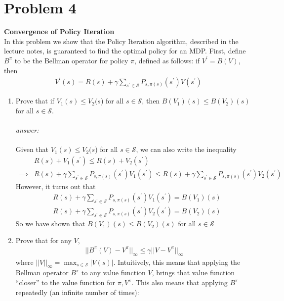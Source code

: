 \documentclass{article}
\begin{document}
\section*{Problem 4}
    \textbf{Convergence of Policy Iteration}\\
    In this problem we show that the Policy Iteration algorithm, described in the lecture notes, is guaranteed to find the optimal policy for an MDP. First, define $B^\pi$ to be the Bellman operator for policy $\pi$, defined as follows: if $V^\prime = B(V)$, then\begin{align*}
        V^\prime (s) = R(s)+\gamma \sum_{s^\prime \in \mathcal{S}}P_{s,\pi(s)}(s^\prime )V(s^\prime)
    \end{align*}
\begin{enumerate}[label=(\alph*)]
\item Prove that if $V_1(s) \leq  V_2(s$) for all $s\in \mathcal{S}$, then $B(V_1)(s) \leq  B(V_2)(s)$ for all $s\in \mathcal{S}$.\\\\
\textit{answer:}\\\\
Given that $V_1(s) \leq  V_2(s$) for all $s\in \mathcal{S}$, we can also write the inequality
\begin{align*}
    &R(s) + V_1(s^\prime) \leq R(s) + V_2(s^\prime)\\
    \implies& R(s) + \gamma \sum_{s^\prime \in \mathcal{S}}P_{s,\pi(s)}(s^\prime )V_1(s^\prime) \leq R(s) + \gamma \sum_{s^\prime \in \mathcal{S}}P_{s,\pi(s)}(s^\prime )V_2(s^\prime)
\end{align*}
However, it turns out that
\begin{align*}
    &R(s) + \gamma \sum_{s^\prime \in \mathcal{S}}P_{s,\pi(s)}(s^\prime )V_1(s^\prime) = B(V_1)(s)\\
    &R(s) + \gamma \sum_{s^\prime \in \mathcal{S}}P_{s,\pi(s)}(s^\prime )V_2(s^\prime) = B(V_2)(s)
\end{align*}
So we have shown that $B(V_1)(s) \leq B(V_2)(s)$ for all $s \in \mathcal{S}$
\item Prove that for any $V$, \begin{align*}
    ||B^\pi(V)-V^\pi ||_\infty\leq \gamma ||V-V^\pi ||_\infty
\end{align*}where $||V||_\infty = \max_{s\in \mathcal{S}}|V(s)|$. Intuitively, this means that applying the Bellman operator $B^\pi $ to any value function $V$, brings that value function “closer” to the value function for $\pi, V^\pi $. This also means that applying $B^\pi $ repeatedly (an infinite number of times):\begin{align*}

\end{align*}
\end{enumerate}
\end{document}
